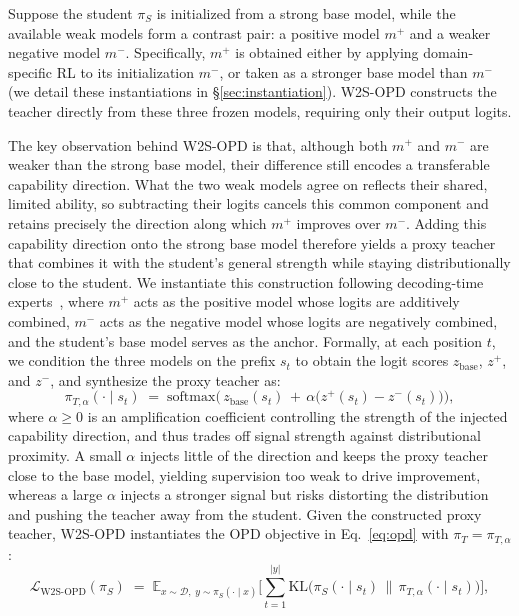 \documentclass{article}
\newcommand\ours{W2S-OPD\xspace}
\begin{document}
Suppose the student $\pi_{S}$ is initialized from a strong base model, while the available weak models form a contrast pair: a positive model $m^{+}$ and a weaker negative model $m^{-}$. Specifically, $m^{+}$ is obtained either by applying domain-specific RL to its initialization $m^{-}$, or taken as a stronger base model than $m^{-}$ (we detail these instantiations in \S\ref{sec:instantiation}). \ours constructs the teacher directly from these three frozen models, requiring only their output logits.

The key observation behind \ours is that, although both $m^{+}$ and $m^{-}$ are weaker than the strong base model, their difference still encodes a transferable capability direction. What the two weak models agree on reflects their shared, limited ability, so subtracting their logits cancels this common component and retains precisely the direction along which $m^{+}$ improves over $m^{-}$. Adding this capability direction onto the strong base model therefore yields a proxy teacher that combines it with the student's general strength while staying distributionally close to the student. We instantiate this construction following decoding-time experts~\citep{liu2021dexperts, liu2024tuning}, where $m^{+}$ acts as the positive model whose logits are additively combined, $m^{-}$ acts as the negative model whose logits are negatively combined, and the student's base model serves as the anchor. Formally, at each position $t$, we condition the three models on the prefix $s_t$ to obtain the logit scores $z_{\mathrm{base}}$, $z^{+}$, and $z^{-}$, and synthesize the proxy teacher as:
\begin{equation}
\label{eq:proxy}
\pi_{T,\alpha}(\cdot \mid s_t) \;=\; \mathrm{softmax}\Big(\, z_{\mathrm{base}}(s_t) \,+\, \alpha \big( z^{+}(s_t) - z^{-}(s_t) \big) \Big),
\end{equation}
where $\alpha \geq 0$ is an amplification coefficient controlling the strength of the injected capability direction, and thus trades off signal strength against distributional proximity.  A small $\alpha$ injects little of the direction and keeps the proxy teacher close to the base model, yielding supervision too weak to drive improvement, whereas a large $\alpha$ injects a stronger signal but risks distorting the distribution and pushing the teacher away from the student. Given the constructed proxy teacher, \ours instantiates the OPD objective in Eq.~\ref{eq:opd} with $\pi_{T} = \pi_{T,\alpha}$:
\begin{equation}
\label{eq:w2sopd}
\mathcal{L}_{\text{W2S-OPD}}(\pi_{S}) \;=\; \mathbb{E}_{x \sim \mathcal{D},\; y \sim \pi_{S}(\cdot \mid x)} \bigg[ \sum_{t=1}^{|y|} \mathrm{KL}\big( \pi_{S}(\cdot \mid s_t) \,\big\|\, \pi_{T,\alpha}(\cdot \mid s_t) \big) \bigg],
\end{equation}
\end{document}
